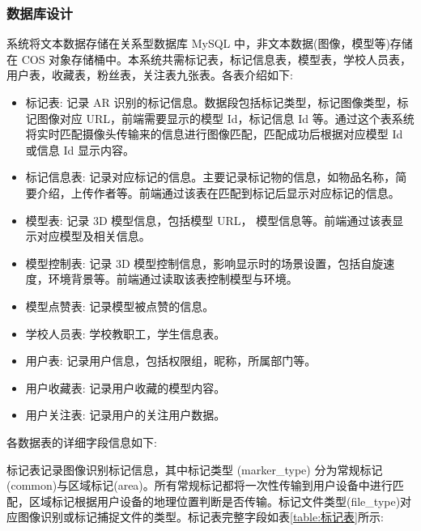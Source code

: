 \subsubsection{数据库设计}

系统将文本数据存储在关系型数据库 MySQL 中，非文本数据(图像，模型等)存储在 COS 对象存储桶中。本系统共需标记表，标记信息表，模型表，学校人员表，用户表，收藏表，粉丝表，关注表九张表。各表介绍如下:
\begin{itemize}
  \item 标记表: 记录 AR 识别的标记信息。数据段包括标记类型，标记图像类型，标记图像对应 URL，前端需要显示的模型 Id，标记信息 Id 等。通过这个表系统将实时匹配摄像头传输来的信息进行图像匹配，匹配成功后根据对应模型 Id 或信息 Id 显示内容。
  \item 标记信息表: 记录对应标记的信息。主要记录标记物的信息，如物品名称，简要介绍，上传作者等。前端通过该表在匹配到标记后显示对应标记的信息。
  \item 模型表: 记录 3D 模型信息，包括模型 URL， 模型信息等。前端通过该表显示对应模型及相关信息。
  \item 模型控制表: 记录 3D 模型控制信息，影响显示时的场景设置，包括自旋速度，环境背景等。前端通过读取该表控制模型与环境。
  \item 模型点赞表: 记录模型被点赞的信息。
  \item 学校人员表: 学校教职工，学生信息表。
  \item 用户表: 记录用户信息，包括权限组，昵称，所属部门等。
  \item 用户收藏表: 记录用户收藏的模型内容。
  \item 用户关注表: 记录用户的关注用户数据。
\end{itemize}

各数据表的详细字段信息如下:

标记表记录图像识别标记信息，其中标记类型 (marker\_type) 分为常规标记(common)与区域标记(area)。所有常规标记都将一次性传输到用户设备中进行匹配，区域标记根据用户设备的地理位置判断是否传输。标记文件类型(file\_type)对应图像识别或标记捕捉文件的类型。标记表完整字段如表\ref{table:标记表}所示:

